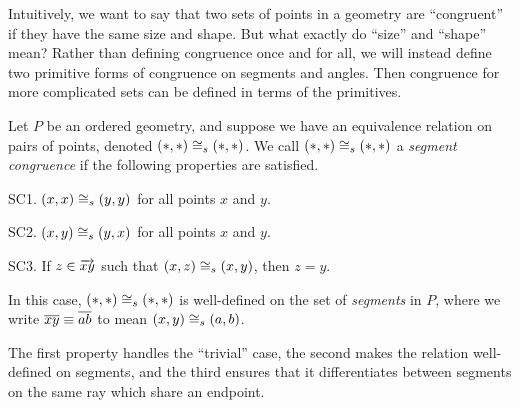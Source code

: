 Intuitively, we want to say that two sets of points in a geometry are ``congruent'' if they have the same size and shape.
But what exactly do ``size'' and ``shape'' mean?
Rather than defining congruence once and for all, we will instead define two primitive forms of congruence on segments and angles.
Then congruence for more complicated sets can be defined in terms of the primitives.

\begin{dfn}
Let \(P\) be an ordered geometry, and suppose we have an equivalence relation on pairs of points, denoted \((\ast,\ast) \cong_s (\ast,\ast)\).
We call \((\ast,\ast) \cong_s (\ast,\ast)\) a \emph{segment congruence} if the following properties are satisfied.
\begin{proplist}
\item[SC1.] \((x,x) \cong_s (y,y)\) for all points \(x\) and \(y\).
\item[SC2.] \((x,y) \cong_s (y,x)\) for all points \(x\) and \(y\).
\item[SC3.] If \(z \in \overrightarrow{xy}\) such that \((x,z) \cong_s (x,y)\), then \(z = y\).
\end{proplist}
In this case, \((\ast,\ast) \cong_s (\ast,\ast)\) is well-defined on the set of \emph{segments} in \(P\), where we write \(\overline{xy} \equiv \overline{ab}\) to mean \((x,y) \cong_s (a,b)\).
\end{dfn}

The first property handles the ``trivial'' case, the second makes the relation well-defined on segments, and the third ensures that it differentiates between segments on the same ray which share an endpoint.

